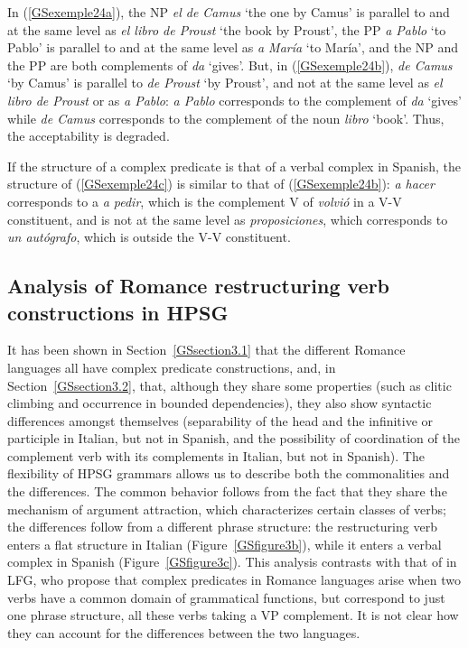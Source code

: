 {In (\ref{GSexemple24a}), the NP \emph{el de Camus} `the one by Camus' is parallel to and at the same level as \emph{el libro de Proust} `the book by Proust', the PP \emph{a Pablo} `to Pablo' is parallel to and at the same level as \emph{a Mar\'ia} `to Mar\'ia', and the NP and the PP are both complements of \emph{da} `gives'. But, in (\ref{GSexemple24b}), \emph{de Camus} `by Camus' is parallel to \emph{de Proust} `by Proust', and not at the same level as \emph{el libro de Proust} or as \emph{a Pablo}: \emph{a Pablo} corresponds to the complement of \emph{da} `gives' while \emph{de Camus} corresponds to the complement of the noun \emph{libro} `book'. Thus, the acceptability is degraded. 

If the structure of a complex predicate is that of a verbal complex in Spanish, the structure of (\ref{GSexemple24c}) is similar to that of (\ref{GSexemple24b}): \emph{a hacer} corresponds to a \emph{a pedir}, which is the complement V of \emph{volvi\'o} in a V-V constituent, and is not at the same level as \emph{proposiciones}, which corresponds to \emph{un aut\'ografo}, which is outside the V-V constituent.   

\subsection{Analysis of Romance restructuring verb constructions in HPSG} \label{GSsection3.3}
\label{sec-romance-complex-predicates}

It has been shown in Section~\ref{GSsection3.1} that the different Romance languages all have complex predicate constructions, and, in Section~\ref{GSsection3.2}, that, although they share some properties (such as clitic climbing and occurrence in bounded dependencies), they also show syntactic differences amongst themselves (separability of the head and the infinitive or participle in Italian, but not in Spanish, and the possibility of coordination of the complement verb with its complements in Italian, but not in Spanish). The flexibility of HPSG grammars allows us to describe both the commonalities and the differences. The common behavior follows from the fact that they share the mechanism of argument attraction, which characterizes certain classes of verbs; the differences follow from a different phrase structure: the restructuring verb enters a flat structure in Italian (Figure~\ref{GSfigure3b}), while it enters a verbal complex in Spanish (Figure~\ref{GSfigure3c}). This analysis contrasts with that of \cite{andrews1999complex} in LFG, who propose that complex predicates in Romance languages arise when two verbs have a common domain of grammatical functions, but correspond to just one phrase structure, all these verbs taking a VP complement. It is not clear how they can account for the differences between the two languages.

}
